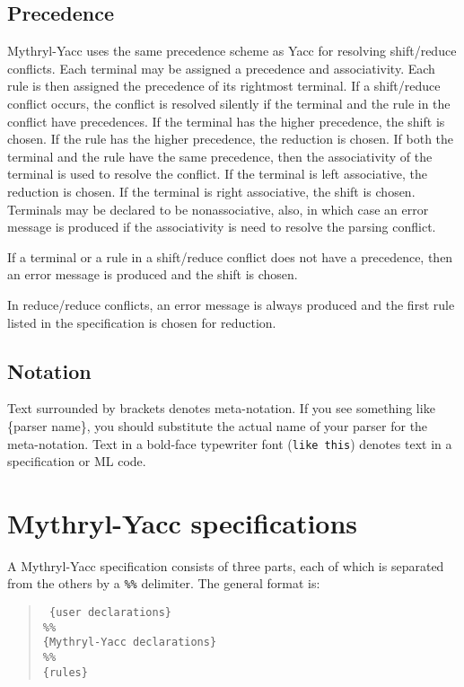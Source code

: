 \subsection{Precedence}
Mythryl-Yacc uses the same precedence scheme as Yacc for resolving
shift/reduce conflicts.  Each terminal may be assigned a precedence and
associativity.  Each rule is then assigned the precedence of its rightmost
terminal.  If a shift/reduce conflict occurs, the conflict is resolved
silently if the terminal and the rule in the conflict have
precedences.
If the terminal has the higher precedence, the shift is chosen.  If
the rule has the higher precedence, the reduction is chosen.  If both
the terminal and the rule have the same precedence, then the associativity
of the terminal is used to resolve the conflict.  If the terminal is
left associative, the reduction is chosen.  If the terminal is 
right associative, the shift is chosen.   Terminals may be declared to 
be nonassociative, also, in which case an error message is produced
if the associativity is need to resolve the parsing conflict.

If a terminal or a rule in a shift/reduce conflict does not have
a precedence, then an error message is produced and the shift
is chosen.

In reduce/reduce conflicts, an error message is always produced and
the first rule listed in the specification is chosen for reduction.
\subsection{Notation}

Text surrounded by brackets denotes meta-notation.  If you see
something like \{parser name\}, you should substitute the actual
name of your parser for the meta-notation.  Text in a bold-face
typewriter font ({\tt like this}) denotes text in a specification 
or ML code.

\section{Mythryl-Yacc specifications}

A Mythryl-Yacc specification consists of three parts, each of which is
separated from the others by a {\tt \%\%} delimiter.  The general format is:
\begin{quote}
\tt
        \{user declarations\} \\
        \%\% \\
        \{Mythryl-Yacc declarations\} \\
        \%\% \\
        \{rules\}
\end{quote}

